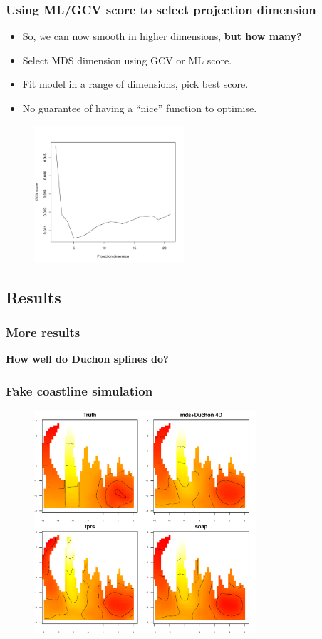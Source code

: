 \documentclass[ignorenonframetext]{beamer} %
\newcommand{\bc}{\begin{center}}
\newcommand{\ec}{\end{center}}
\newcommand{\bi}{\begin{itemize}}
\newcommand{\ei}{\end{itemize}}
\begin{document}
\begin{frame}
	\frametitle{Using ML/GCV score to select projection dimension}
   \bi
      \item So, we can now smooth in higher dimensions, \textbf{but how many?}
      \item Select MDS dimension using GCV or ML score.
      \item Fit model in a range of dimensions, pick best score.
      \item No guarantee of having a ``nice'' function to optimise.
   \ei
   \begin{figure}
   \centering
   \includegraphics[height=2in]{figs/gcv-dim-aral.pdf}
   \end{figure}
\end{frame}



\subsection{Results}

\begin{frame}
	\frametitle{More results}
	\bc \textbf{How well do Duchon splines do?}\ec
\end{frame}


\begin{frame}
	\frametitle{Fake coastline simulation}
	\begin{figure}
	\includegraphics[height=3.25in]{figs/wt2-comp.pdf}
	\end{figure}
\end{frame}
\end{document}
